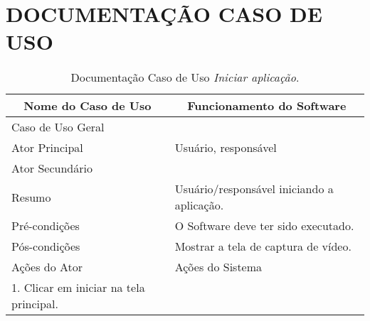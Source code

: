 \chapter{DOCUMENTAÇÃO CASO DE USO}
\label{Apx:A}



\begin{longtable}{|l|l|}
\caption{Documentação Caso de Uso \textit{Iniciar aplicação}.} \label{tab:dcu-1} \\
\hline 
\multicolumn{1}{|c|}{\textbf{Nome do Caso de Uso}} & 
\multicolumn{1}{c|}{\textbf{Funcionamento do Software}} \\ \hline 
\endfirsthead
\hline
Caso de Uso Geral &  \\ \hline
Ator Principal & Usuário, responsável\\ \hline
Ator Secundário &  \\ \hline
Resumo & Usuário/responsável iniciando a aplicação. \\ \hline 
Pré-condições &  O Software deve ter sido executado. \\ \hline 
Pós-condições &  Mostrar a tela de captura de vídeo. \\ \hline
 Ações do Ator& Ações do Sistema \\ \hline
 1.	Clicar em iniciar na tela principal.&  \\ \hline
\end{longtable}


